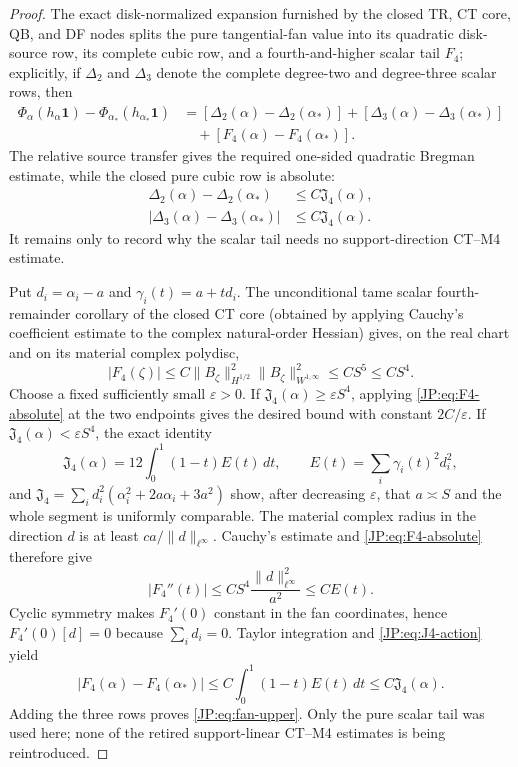 \documentclass[11pt]{amsart}
\numberwithin{equation}{section}
\theoremstyle{definition}
\theoremstyle{remark}
\newcommand{\Jfour}{\mathfrak J_4}
\begin{document}
\begin{proof}
The exact disk-normalized expansion furnished by the closed TR, CT core,
QB, and DF nodes splits the pure tangential-fan value into its quadratic
disk-source row, its complete cubic row, and a fourth-and-higher scalar
tail $F_4$; explicitly, if $\Delta_2$ and $\Delta_3$ denote the complete
degree-two and degree-three scalar rows, then
\begin{align*}
 \Phi_\alpha(h_\alpha\mathbf1)
 -\Phi_{\alpha_*}(h_{\alpha_*}\mathbf1)
 &=[\Delta_2(\alpha)-\Delta_2(\alpha_*)]
   +[\Delta_3(\alpha)-\Delta_3(\alpha_*)]\\
 &\quad+[F_4(\alpha)-F_4(\alpha_*)].
\end{align*}
The relative source transfer gives the required one-sided quadratic
Bregman estimate, while the closed pure cubic row is absolute:
\begin{align*}
 \Delta_2(\alpha)-\Delta_2(\alpha_*)&\le C\Jfour(\alpha),\\
 |\Delta_3(\alpha)-\Delta_3(\alpha_*)|&\le C\Jfour(\alpha).
\end{align*}
It remains only to record why the scalar tail needs no support-direction
CT--M4 estimate.

Put $d_i=\alpha_i-a$ and
$\gamma_i(t)=a+td_i$.  The unconditional tame scalar fourth-remainder
corollary of the closed CT core (obtained by applying Cauchy's coefficient
estimate to the complex natural-order Hessian) gives, on the real chart
and on its material complex polydisc,
\begin{equation}\label{JP:eq:F4-absolute}
 |F_4(\zeta)|
 \le C\|B_\zeta\|_{H^{1/2}}^2
        \|B_\zeta\|_{W^{1,\infty}}^2
 \le CS^5\le CS^4.
\end{equation}
Choose a fixed sufficiently small $\varepsilon>0$.  If
$\Jfour(\alpha)\ge\varepsilon S^4$, applying
\eqref{JP:eq:F4-absolute} at the two endpoints gives the desired bound with
constant $2C/\varepsilon$.  If
$\Jfour(\alpha)<\varepsilon S^4$, the exact identity
\begin{equation}\label{JP:eq:J4-action}
 \Jfour(\alpha)
 =12\int_0^1(1-t)E(t)\,dt,
 \qquad E(t)=\sum_i\gamma_i(t)^2d_i^2,
\end{equation}
and
\(
 \Jfour=\sum_i d_i^2(\alpha_i^2+2a\alpha_i+3a^2)
\)
show, after decreasing $\varepsilon$, that
$a\asymp S$ and the whole segment is uniformly comparable.  The material
complex radius in the direction $d$ is at least
$ca/\|d\|_{\ell^\infty}$.  Cauchy's estimate and
\eqref{JP:eq:F4-absolute} therefore give
\[
 |F_4''(t)|
 \le CS^4\frac{\|d\|_{\ell^\infty}^2}{a^2}
 \le C E(t).
\]
Cyclic symmetry makes $F_4'(0)$ constant in the fan coordinates, hence
$F_4'(0)[d]=0$ because $\sum_i d_i=0$.  Taylor integration and
\eqref{JP:eq:J4-action} yield
\[
 |F_4(\alpha)-F_4(\alpha_*)|
 \le C\int_0^1(1-t)E(t)\,dt
 \le C\Jfour(\alpha).
\]
Adding the three rows proves \eqref{JP:eq:fan-upper}.  Only the pure scalar
tail was used here; none of the retired support-linear CT--M4 estimates is
being reintroduced.
\end{proof}
\end{document}
